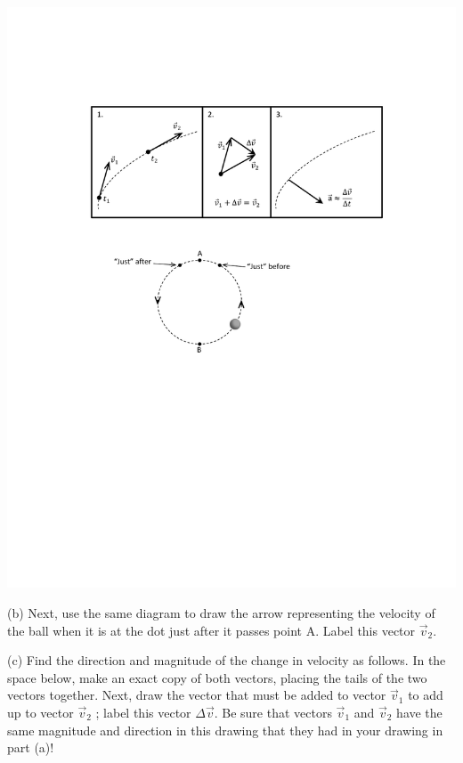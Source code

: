 {\par\centering \includegraphics{circ_motion/circ_motion_fig2_new.pdf} \par}

(b) Next, use the same diagram to draw the arrow representing the velocity of
the ball when it is at the dot just after it passes point A. Label this vector
$\vec{v}_{2}$.

(c) Find the direction and magnitude of the change in velocity as follows. In
the space below, make an exact copy of both vectors, placing the tails of the
two vectors together. Next, draw the vector that must be added to vector $\vec{v}_{1}$
to add up to vector $\vec{v}_{2}$ ; label this vector \( \Delta  \)$\vec{v}$.
Be sure that vectors $\vec{v}_{1}$ and $\vec{v}_{2}$ have the
same magnitude and direction in this drawing that they had in your drawing in
part (a)!
\vspace{30mm}


